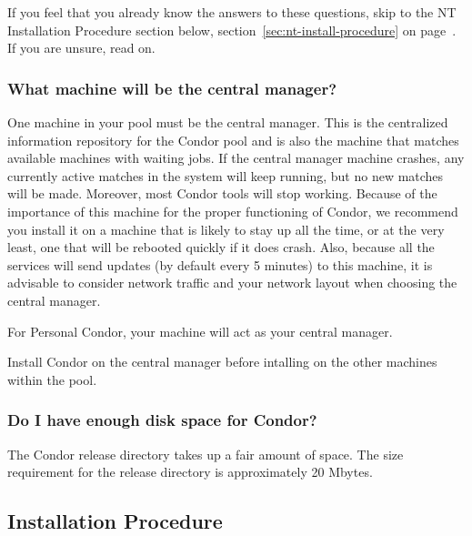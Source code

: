 If you feel that you already know the answers to these questions,
skip to the NT Installation Procedure section below,
section~\ref{sec:nt-install-procedure} on
page~\pageref{sec:nt-install-procedure}.
If you are unsure, read on.

\subsubsection{What machine will be the central manager?}

One machine in your pool must be the central manager.
This is the
centralized information repository for the Condor pool and is also the
machine that matches available machines with waiting
jobs.  If the central manager machine crashes, any currently active
matches in the system will keep running, but no new matches will be
made.  Moreover, most Condor tools will stop working.  Because of the
importance of this machine for the proper functioning of Condor, we
recommend you install it on a machine that is likely to stay up all the
time, or at the very least, one that will be rebooted quickly if it
does crash.  Also, because all the services will send updates (by
default every 5 minutes) to this machine, it is advisable to consider
network traffic and your network layout when choosing the central
manager.

For Personal Condor, your machine will act as your central manager.

Install Condor on the central manager before intalling
on the other machines within the pool.

\subsubsection{Do I have enough disk space for Condor?}

The Condor release directory takes up a fair amount of space.
The size requirement for the release
directory is approximately 20 Mbytes.

\subsection{\label{sec:nt-install-procedure}
Installation Procedure}

